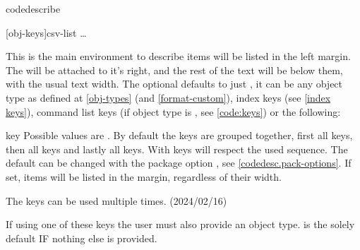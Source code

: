\documentclass{article}
\begin{document}
\begin{codedescribe}[env,new=2023/05/01,update=2023/05/01,note={a  note example},update=2024/02/16,update=2025/09/25]{codedescribe}
\begin{codesyntax}
\tsmacro{\begin{codedescribe}}[obj-keys]{csv-list}
\ldots
\tsmacro{\end{codedescribe}}{}
\end{codesyntax}
This is the main environment to describe   items will be listed  in the left margin. The  will be attached to it's right, and the rest of the text will be below them, with the usual text width.   The optional  defaults to just , it can be any object type as defined at \ref{obj-types} (and \ref{format-custom}), index keys (see \ref{index keys}), command list keys (if object type is , see \ref{code:keys}) or the following:
\end{codedescribe}
\begin{describelist*}{key}
   {Possible values are . By default the keys  are grouped together, first all  keys, then all  keys and lastly all  keys. With  keys will respect the used sequence. The default can be changed with the package option , see \ref{codedesc.pack-options}.}
   {If set,  items will be listed in the margin, regardless of their width.}
\end{describelist*}
\begin{tsremark}
The keys  can be used multiple times. (2024/02/16)
\end{tsremark}
\begin{tsremark}
  If using one of these keys the user must also provide an object type.  is the solely default IF nothing else is provided.
\end{tsremark}
\end{document}
